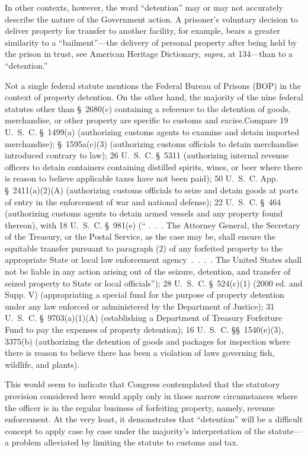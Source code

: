   In other contexts, however, the word ``detention'' may or may not accurately describe the nature of the Government action. A prisoner's voluntary decision to deliver property for transfer to another facility, for example, bears a greater similarity to a ``bailment''---the delivery of personal property after being held by the prison in trust, see American Heritage Dictionary, \emph{supra,} at 134---than to a ``detention.''

  Not a single federal statute mentions the Federal Bureau of Prisons (BOP) in the context of property detention. On the other hand, the majority of the nine federal statutes other than \S~2680(c) containing a reference to the detention of goods, merchandise, or other property are specific to customs and excise.Compare 19 U.~S.~C. \S~1499(a) (authorizing customs agents to examine and detain imported merchandise); \S~1595a(c)(3) (authorizing customs officials to detain merchandise introduced contrary to law); 26 U.~S.~C. \S~5311 (authorizing internal revenue officers to detain containers containing distilled spirits, wines, or beer where there is reason to believe applicable taxes have not been paid); 50 U.~S.~C. App. \S~2411(a)(2)(A) (authorizing customs officials to seize and detain goods at ports of entry in the enforcement of war and national defense); 22 U.~S.~C. \S~464 (authorizing customs agents to detain armed vessels and any property \newpage  found thereon), with 18 U.~S.~C. \S~981(e) (`` .~.~. The Attorney General, the Secretary of the Treasury, or the Postal Service, as the case may be, shall ensure the equitable transfer pursuant to paragraph (2) of any forfeited property to the appropriate State or local law enforcement agency~.~.~.~. The United States shall not be liable in any action arising out of the seizure, detention, and transfer of seized property to State or local officials''); 28 U.~S.~C. \S~524(c)(1) (2000 ed. and Supp. V) (appropriating a special fund for the purpose of property detention under any law enforced or administered by the Department of Justice); 31 U.~S.~C. \S~9703(a)(1)(A) (establishing a Department of Treasury Forfeiture Fund to pay the expenses of property detention); 16 U.~S.~C. \S\S~1540(e)(3), 3375(b) (authorizing the detention of goods and packages for inspection where there is reason to believe there has been a violation of laws governing fish, wildlife, and plants).

  This would seem to indicate that Congress contemplated that the statutory provision considered here would apply only in those narrow circumstances where the officer is in the regular business of forfeiting property, namely, revenue enforcement. At the very least, it demonstrates that ``detention'' will be a difficult concept to apply case by case under the majority's interpretation of the statute---a problem alleviated by limiting the statute to customs and tax.

